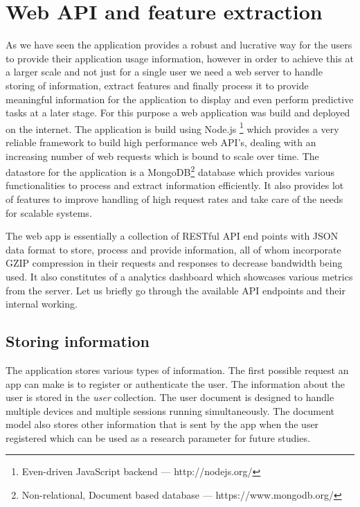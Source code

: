 \documentclass[12pt]{report}
\begin{document}
\section{Web API and feature extraction}

As we have seen the application provides a robust and lucrative way for the users to provide their application usage information, however in order to achieve this at a larger scale and not just for a single user we need a web server to handle storing of information, extract features and finally process it to provide meaningful information for the application to display and even perform predictive tasks at a later stage. For this purpose a web application was build and deployed on the internet. The application is build using Node.js \footnote{Even-driven JavaScript backend — http://nodejs.org/} which provides a very reliable framework to build high performance web API's, dealing with an increasing number of web requests \cite{tilkov2010node} which is bound to scale over time. The datastore for the application is a MongoDB\footnote{Non-relational, Document based database — https://www.mongodb.org/} database which provides various functionalities to process and extract information efficiently. It also provides lot of features to improve handling of high request rates and take care of the needs for scalable systems.

The web app is essentially a collection of RESTful API end points with JSON data format to store, process and provide information, all of whom incorporate GZIP compression in their requests and responses to decrease bandwidth being used. It also constitutes of a analytics dashboard which showcases various metrics from the server. Let us briefly go through the available API endpoints and their internal working.

\subsection{Storing information}
\label{StoringInfo}

The application stores various types of information. The first possible request an app can make is to register or authenticate the user. The information about the user is stored in the \textit{user} collection. The user document is designed to handle multiple devices and multiple sessions running simultaneously. The document model also stores other information that is sent by the app when the user registered which can be used as a research parameter for future studies.
\end{document}
